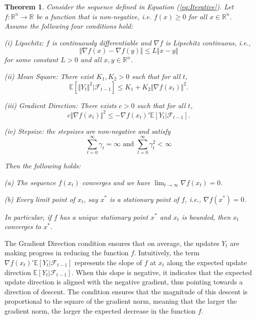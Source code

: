 \documentclass[letter,11pt]{article}
\newtheorem{theorem}{Theorem}[section]
\begin{document}
\begin{theorem} \label{thm:convergence}
Consider the sequence defined in Equation (\ref{eq:Iterative}). Let $f: \mathbb{R}^{n} \rightarrow \mathbb{R}$ be a function that is non-negative, i.e. $f(x) \geq 0$ for all $x \in \mathbb{R}^{n}$. Assume the following four conditions hold: 

(i) Lipschitz:  $f$ is continuously differentiable and $\nabla f$ is Lipschitz continuous, i.e., 
$$ \Vert \nabla f(x) - \nabla f(y) \Vert \leq L \Vert x - y\Vert $$
    for some constant $L > 0$ and all $x,y \in \mathbb{R}^{n}$. 

        (ii) Mean Square: There exist $K_{1},K_{2} > 0$ such that  for all $t$,
    $$\mathbb{E}[\Vert Y_{t} \Vert ^{2} | \mathcal{F}_{t-1} ]\leq K_{1} + K_{2} \Vert \nabla f(x_{t}) \Vert ^{2}.  $$

    (iii) Gradient Direction: There exists $c >0$ such that for all $t$, 
    $$ c\Vert \nabla f(x_{t}) \Vert ^{2} \leq  - \nabla f(x_{t}) '  \mathbb{E}[Y_{t}|\mathcal{F}_{t-1}].  $$

(iv) Stepsize: the stepsizes are non-negative and satisfy 
$$ \sum_{t=0}^{\infty} \gamma_{t} = \infty \text{ and }  \sum _{t=0}^{\infty} \gamma_{t}^{2} < \infty$$

Then the following holds: 

(a) The sequence $f(x_{t})$ converges and we have $\lim _{t \rightarrow \infty } \nabla f(x_{t}) = 0$. 

(b) Every limit point of $x_{t}$, say $x^{*}$  is a stationary point of $f$, i.e., $\nabla f(x^{*}) = 0$. 

In particular, if $f$ has a unique stationary point $x^{*}$ and $x_{t}$ is bounded, then $x_{t}$ converges to $x^{*}$. 

\end{theorem}


The Gradient Direction condition 
ensures that on average, the updates \( Y_{t} \) are making progress in reducing the function \( f \). Intuitively, the term \( \nabla f(x_{t})' \mathbb{E}[Y_{t} | \mathcal{F}_{t-1}] \) represents the slope of $f$ at $x_{t}$ along the expected update direction $\mathbb{E}[Y_{t} | \mathcal{F}_{t-1}]$. When this slope is negative, it indicates that the expected update direction is aligned with the negative gradient, thus pointing towards a direction of descent. The condition ensures that the magnitude of this descent is proportional to the square of the gradient norm, meaning that the larger the gradient norm, the larger the expected decrease in the function \( f \). 
\end{document}

